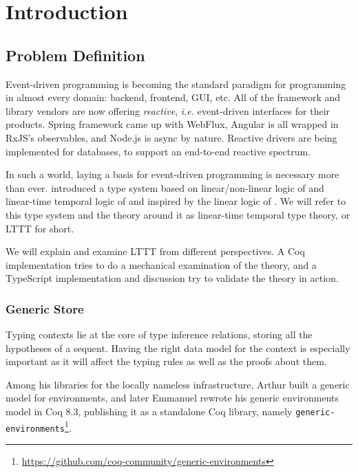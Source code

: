 \chapter{Introduction}\label{chap:introduction}

\section{Problem Definition}

Event-driven programming is becoming the standard paradigm for programming in almost every domain: backend, frontend, GUI, etc. All of the framework and library vendors are now offering \textit{reactive}, \textit{i.e.} event-driven interfaces for their products. Spring framework came up with WebFlux, Angular is all wrapped in RxJS's observables, and Node.js is async by nature. Reactive drivers are being implemented for databases, to support an end-to-end reactive spectrum.

In such a world, laying a basis for event-driven programming is necessary more than ever. \cite{Paykin2016TheEO} introduced a type system based on linear/non-linear logic of \cite{DBLP:conf/csl/Benton94} and linear-time temporal logic of \cite{DBLP:conf/focs/Pnueli77} and inspired by the linear logic of \cite{DBLP:journals/tcs/Girard87}. We will refer to this type system and the theory around it as linear-time temporal type theory, or LTTT for short.

We will explain and examine LTTT from different perspectives. A Coq implementation tries to do a mechanical examination of the theory, and a TypeScript implementation and discussion try to validate the theory in action.

\subsection{Generic Store}

Typing contexts lie at the core of type inference relations, storing all the hypotheses of a sequent. Having the right data model for the context is especially important as it will affect the typing rules as well as the proofs about them.

Among his libraries for the locally nameless infrastructure, Arthur \cite{DBLP:journals/jar/Chargueraud12} built a generic model for environments, and later Emmanuel \cite{DBLP:journals/corr/abs-1112-1316} rewrote his generic environments model in Coq 8.3, publishing it as a standalone Coq library, namely \texttt{generic-environments}\footnote{\url{https://github.com/coq-community/generic-environments}}.

